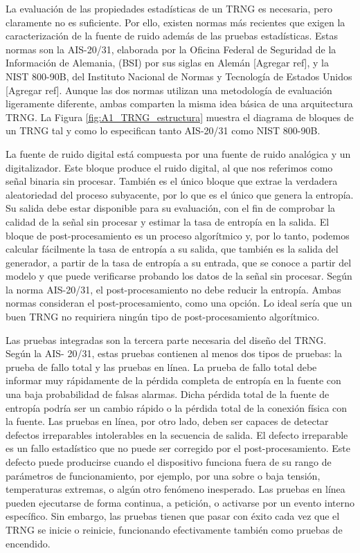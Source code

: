 	La evaluación de las propiedades estadísticas de un TRNG es necesaria, pero claramente no es suficiente. Por ello, existen normas más recientes que exigen la caracterización de la fuente de ruido además de las pruebas estadísticas. Estas normas son la AIS-20/31, elaborada por la Oficina Federal de Seguridad de la Información de Alemania, (BSI) por sus siglas en Alemán [Agregar ref], y la NIST 800-90B, del Instituto Nacional de Normas y Tecnología de Estados Unidos [Agregar ref]. Aunque las dos normas utilizan una metodología de evaluación ligeramente diferente, ambas comparten la misma idea básica de una arquitectura TRNG. La Figura \ref{fig:A1_TRNG_estructura} muestra el diagrama de bloques de un TRNG tal y como lo especifican tanto AIS-20/31 como NIST 800-90B.
	
	La fuente de ruido digital está compuesta por una fuente de ruido analógica y un digitalizador. Este bloque produce el ruido digital, al que nos referimos como señal binaria sin procesar. También es el único bloque que extrae la verdadera aleatoriedad del proceso subyacente, por lo que es el único que genera la entropía. Su salida debe estar disponible para su evaluación, con el fin de comprobar la calidad de la señal sin procesar y estimar la tasa de entropía en la salida. El bloque de post-procesamiento es un proceso algorítmico y, por lo tanto, podemos calcular fácilmente la tasa de entropía a su salida, que también es la salida del generador, a partir de la tasa de entropía a su entrada, que se conoce a partir del modelo y que puede verificarse probando los datos de la señal sin procesar. Según la norma AIS-20/31, el post-procesamiento no debe reducir la entropía. Ambas normas consideran el post-procesamiento, como una opción. Lo ideal sería que un buen TRNG no requiriera ningún tipo de post-procesamiento algorítmico.
	
	Las pruebas integradas son la tercera parte necesaria del diseño del TRNG. Según la AIS- 20/31, estas pruebas contienen al menos dos tipos de pruebas: la prueba de fallo total y las pruebas en línea. La prueba de fallo total debe informar muy rápidamente de la pérdida completa de entropía en la fuente con una baja probabilidad de falsas alarmas. Dicha pérdida total de la fuente de entropía podría ser un cambio rápido o la pérdida total de la conexión física con la fuente. Las pruebas en línea, por otro lado, deben ser capaces de detectar defectos irreparables intolerables en la secuencia de salida. El defecto irreparable es un fallo estadístico que no puede ser corregido por el post-procesamiento. Este defecto puede producirse cuando el dispositivo funciona fuera de su rango de parámetros de funcionamiento, por ejemplo, por una sobre o baja tensión, temperaturas extremas, o algún otro fenómeno inesperado. Las pruebas en línea pueden ejecutarse de forma continua, a petición, o activarse por un evento interno específico. Sin embargo, las pruebas tienen que pasar con éxito cada vez que el TRNG se inicie o reinicie, funcionando efectivamente también como pruebas de encendido.

